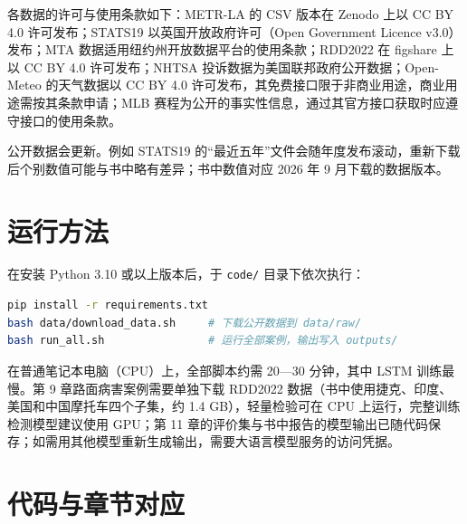 各数据的许可与使用条款如下：METR-LA 的 CSV 版本在 Zenodo 上以 CC BY 4.0 许可发布\cite{kwak2020metrla}；STATS19 以英国开放政府许可（Open Government Licence v3.0）发布；MTA 数据适用纽约州开放数据平台的使用条款；RDD2022 在 figshare 上以 CC BY 4.0 许可发布；NHTSA 投诉数据为美国联邦政府公开数据；Open-Meteo 的天气数据以 CC BY 4.0 许可发布\cite{openmeteo2026}，其免费接口限于非商业用途，商业用途需按其条款申请；MLB 赛程为公开的事实性信息，通过其官方接口获取时应遵守接口的使用条款。

公开数据会更新。例如 STATS19 的“最近五年”文件会随年度发布滚动，重新下载后个别数值可能与书中略有差异；书中数值对应 2026 年 9 月下载的数据版本。

\section{运行方法}

在安装 Python 3.10 或以上版本后，于 \texttt{code/} 目录下依次执行：

\begin{lstlisting}[language=bash,numbers=none,caption={复现全书结果}]
pip install -r requirements.txt
bash data/download_data.sh     # 下载公开数据到 data/raw/
bash run_all.sh                # 运行全部案例，输出写入 outputs/
\end{lstlisting}

在普通笔记本电脑（CPU）上，全部脚本约需 20—30 分钟，其中 LSTM 训练最慢。第 9 章路面病害案例需要单独下载 RDD2022 数据（书中使用捷克、印度、美国和中国摩托车四个子集，约 1.4 GB），轻量检验可在 CPU 上运行，完整训练检测模型建议使用 GPU；第 11 章的评价集与书中报告的模型输出已随代码保存；如需用其他模型重新生成输出，需要大语言模型服务的访问凭据。

\section{代码与章节对应}

